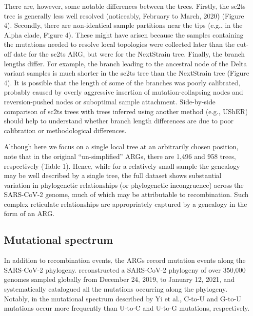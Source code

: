 \documentclass{article}
\begin{document}
There are, however, some notable differences between the trees. Firstly, the
sc2ts tree is generally less well resolved (noticeably, February to March,
2020) (Figure 4). Secondly, there are non-identical sample partitions near the
tips (e.g., in the Alpha clade, Figure 4). These might have arisen because the
samples containing the mutations needed to resolve local topologies were
collected later than the cut-off date for the sc2ts ARG, but were for the
NextStrain tree. Finally, the branch lengths differ. For example, the branch
leading to the ancestral node of the Delta variant samples is much shorter in
the sc2ts tree than the NextStrain tree (Figure 4). It is possible that the
length of some of the branches was poorly calibrated, probably caused by overly
aggressive insertion of mutation-collapsing nodes and reversion-pushed nodes or
suboptimal sample attachment. Side-by-side comparison of sc2ts trees with trees
inferred using another method (e.g., UShER) should help to understand whether
branch length differences are due to poor calibration or methodological
differences.

Although here we focus on a single local tree at an arbitrarily chosen
position, note that in the original ``un-simplified'' ARGs, there are 1,496 and
958 trees, respectively (Table 1). Hence, while for a relatively small sample
the genealogy may be well described by a single tree, the full dataset shows
substantial variation in phylogenetic relationships (or phylogenetic
incongruence) across the SARS-CoV-2 genome, much of which may be attributable
to recombination. Such complex reticulate relationships are appropriately
captured by a genealogy in the form of an ARG.

\subsection{Mutational spectrum}

In addition to recombination events, the ARGs record mutation events along the
SARS-CoV-2 phylogeny. \cite{Yi2021-sc} reconstructed a SARS-CoV-2
phylogeny of over 350,000 genomes sampled globally from December 24, 2019, to
January 12, 2021, and systematically catalogued all the mutations occurring
along the phylogeny. Notably, in the mutational spectrum described by Yi et
al., C-to-U and G-to-U mutations occur more frequently than U-to-C and U-to-G
mutations, respectively.
\end{document}
